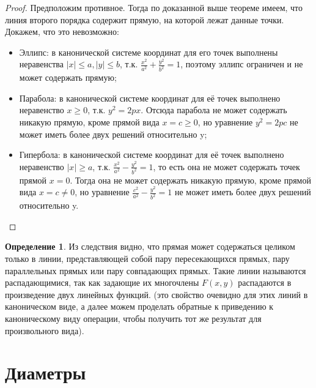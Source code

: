 \documentclass[a4paper, 12pt]{article}
\theoremstyle{definition}
\newtheorem*{definition}{Определение}
\begin{document}
	\begin{proof}
		Предположим противное. Тогда по доказанной выше теореме имеем, что линия второго порядка содержит прямую, на которой лежат данные точки. Докажем, что это невозможно:
		\begin{itemize}
			\item Эллипс: в канонической системе координат для его точек выполнены неравенства $|x| \leqslant a, |y| \leqslant b$, т.к. $\frac{x^2}{a^2} + \frac{y^2}{b^2} = 1$, поэтому эллипс ограничен и не может содержать прямую;
			\item Парабола: в канонической системе координат для её точек выполнено неравенство $x \geqslant 0$, т.к. $y^2 = 2px$. Отсюда парабола не может содержать никакую прямую, кроме прямой вида $x = c \geqslant 0$, но уравнение $y^2 = 2pc$ не может иметь более двух решений относительно y;
			\item Гипербола: в канонической системе координат для её точек выполнено неравенство $|x| \geqslant a$, т.к. $\frac{x^2}{a^2} - \frac{y^2}{b^2} = 1$, то есть она не может содержать точек прямой $x = 0$. Тогда она не может содержать никакую прямую, кроме прямой вида $x = c \neq 0$, но уравнение $\frac{c^2}{a^2} - \frac{y^2}{b^2} = 1$ не может иметь более двух решений относительно y.
		\end{itemize}
	\end{proof}
	\begin{definition}
		Из следствия видно, что прямая может содержаться целиком только в линии, представляющей собой пару пересекающихся прямых, пару параллельных прямых или пару совпадающих прямых. Такие линии называются распадающимися, так как задающие их многочлены $F(x, y)$ распадаются в произведение двух линейных функций.
		(это свойство очевидно для этих линий в каноническом виде, а далее можем проделать обратные к приведению к каноническому виду операции, чтобы получить тот же результат для произвольного вида). 
	\end{definition}
	\section{Диаметры}
\end{document}
